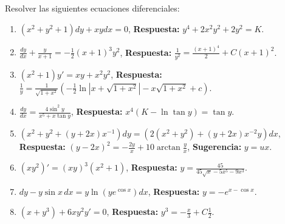 Resolver las siguientes ecuaciones diferenciales:

\begin{enumerate}
    \item \( (x^2 + y^2 + 1)dy + xy dx = 0 \), \textbf{Respuesta:} \( y^4 + 2x^2 y^2 + 2y^2 = K \).

    \item \( \frac{dy}{dx} + \frac{y}{x+1} = -\frac{1}{2}(x+1)^3 y^2 \), \textbf{Respuesta:} \( \frac{1}{y^2} = \frac{(x+1)^4}{2} + C(x+1)^2 \).

    \item \( (x^2 + 1)y' = xy + x^2 y^2 \), \textbf{Respuesta:} \( \frac{1}{y} = \frac{1}{\sqrt{1+x^2}} \left(-\frac{1}{2} \ln |x + \sqrt{1+x^2}| - x \sqrt{1+x^2} + c \right) \).

    \item \( \frac{dy}{dx} = \frac{4 \sin^2 y}{x^5 + x \tan y} \), \textbf{Respuesta:} \( x^4(K - \ln \tan y) = \tan y \).

    \item \( (x^2 + y^2 + (y + 2x)x^{-1}) dy = (2(x^2 + y^2) + (y + 2x)x^{-2}y)dx \),  
    \textbf{Respuesta:} \( (y - 2x)^2 = -\frac{2y}{x} + 10 \arctan \frac{y}{x} \), \textbf{Sugerencia:} \( y = ux \).

    \item \( (xy^2)' = (xy)^3 (x^2 + 1) \), \textbf{Respuesta:} \( y = \frac{45}{45 \sqrt{x} - 5x^5 - 9x^3} \).

    \item \( dy - y \sin x \,dx = y \ln(y e^{\cos x})dx \), \textbf{Respuesta:} \( y = -e^{x - \cos x} \).

    \item \( (x + y^3) + 6xy^2 y' = 0 \), \textbf{Respuesta:} \( y^3 = -\frac{x}{3} + C \frac{1}{2} \).

\end{enumerate}

